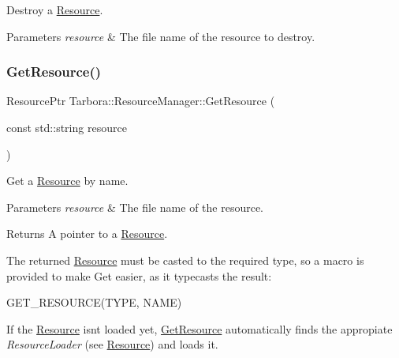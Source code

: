 Destroy a \hyperlink{classTarbora_1_1Resource}{Resource}. 


\begin{DoxyParams}{Parameters}
{\em resource} & The file name of the resource to destroy. \\
\hline
\end{DoxyParams}
\mbox{\label{classTarbora_1_1ResourceManager_a755c3216ac424ec13d28fa84b0814e0b}} 
\subsubsection{\texorpdfstring{Get\+Resource()}{GetResource()}}
{\footnotesize\ttfamily Resource\+Ptr Tarbora\+::\+Resource\+Manager\+::\+Get\+Resource (\begin{DoxyParamCaption}\item[{const std\+::string}]{resource }\end{DoxyParamCaption})\hspace{0.3cm}{\ttfamily [static]}}



Get a \hyperlink{classTarbora_1_1Resource}{Resource} by name. 


\begin{DoxyParams}{Parameters}
{\em resource} & The file name of the resource. \\
\hline
\end{DoxyParams}
\begin{DoxyReturn}{Returns}
A pointer to a \hyperlink{classTarbora_1_1Resource}{Resource}.
\end{DoxyReturn}
The returned \hyperlink{classTarbora_1_1Resource}{Resource} must be casted to the required type, so a macro is provided to make Get easier, as it typecasts the result\+: 
\begin{DoxyCode}
GET\_RESOURCE(TYPE, NAME)
\end{DoxyCode}


If the \hyperlink{classTarbora_1_1Resource}{Resource} isn\textquotesingle{}t loaded yet, \hyperlink{classTarbora_1_1ResourceManager_a755c3216ac424ec13d28fa84b0814e0b}{Get\+Resource} automatically finds the appropiate {\itshape Resource\+Loader} (see \hyperlink{classTarbora_1_1Resource}{Resource}) and loads it. \mbox{\label{classTarbora_1_1ResourceManager_a1db550759320be50e86b316275da889c}} 
